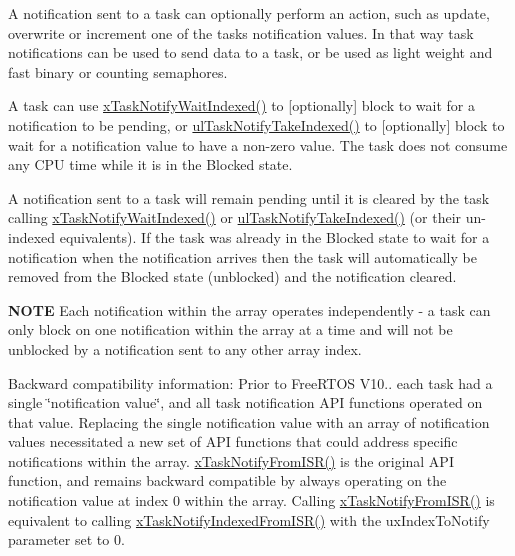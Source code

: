 A notification sent to a task can optionally perform an action, such as update, overwrite or increment one of the task\textquotesingle{}s notification values. In that way task notifications can be used to send data to a task, or be used as light weight and fast binary or counting semaphores.

A task can use \hyperlink{externals_2freertos_2include_2task_8h_a5bcd5a5b7d7c41dd782a38093be1b7c9}{x\+Task\+Notify\+Wait\+Indexed()} to \mbox{[}optionally\mbox{]} block to wait for a notification to be pending, or \hyperlink{externals_2freertos_2include_2task_8h_a4f42982425f3b106e1a9f19b41ba4124}{ul\+Task\+Notify\+Take\+Indexed()} to \mbox{[}optionally\mbox{]} block to wait for a notification value to have a non-\/zero value. The task does not consume any C\+PU time while it is in the Blocked state.

A notification sent to a task will remain pending until it is cleared by the task calling \hyperlink{externals_2freertos_2include_2task_8h_a5bcd5a5b7d7c41dd782a38093be1b7c9}{x\+Task\+Notify\+Wait\+Indexed()} or \hyperlink{externals_2freertos_2include_2task_8h_a4f42982425f3b106e1a9f19b41ba4124}{ul\+Task\+Notify\+Take\+Indexed()} (or their un-\/indexed equivalents). If the task was already in the Blocked state to wait for a notification when the notification arrives then the task will automatically be removed from the Blocked state (unblocked) and the notification cleared.

{\bfseries N\+O\+TE} Each notification within the array operates independently -\/ a task can only block on one notification within the array at a time and will not be unblocked by a notification sent to any other array index.

Backward compatibility information\+: Prior to Free\+R\+T\+OS V10.. each task had a single \char`\"{}notification value\char`\"{}, and all task notification A\+PI functions operated on that value. Replacing the single notification value with an array of notification values necessitated a new set of A\+PI functions that could address specific notifications within the array. \hyperlink{externals_2freertos_2include_2task_8h_a1ed9129068b96a909356bd0369c5ecb0}{x\+Task\+Notify\+From\+I\+S\+R()} is the original A\+PI function, and remains backward compatible by always operating on the notification value at index 0 within the array. Calling \hyperlink{externals_2freertos_2include_2task_8h_a1ed9129068b96a909356bd0369c5ecb0}{x\+Task\+Notify\+From\+I\+S\+R()} is equivalent to calling \hyperlink{externals_2freertos_2include_2task_8h_ab86169cb5493142a9e247e2cf2e583e2}{x\+Task\+Notify\+Indexed\+From\+I\+S\+R()} with the ux\+Index\+To\+Notify parameter set to 0.


